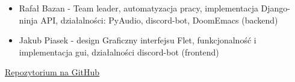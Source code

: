 \documentclass[polish]{article}
\begin{document}
        \begin{itemize}

            \item Rafał Bazan - Team leader, automatyzacja pracy, implementacja Django-ninja API, działalności: PyAudio, discord-bot, DoomEmacs  (backend)
            \item Jakub Piasek - design Graficzny interfejsu Flet, funkcjonalność i implementacja gui, działalności discord-bot (frontend)

        \end{itemize}

    \href{https://github.com/bafaurazan/talk_bot}{Repozytorium na GitHub}
\end{document}
